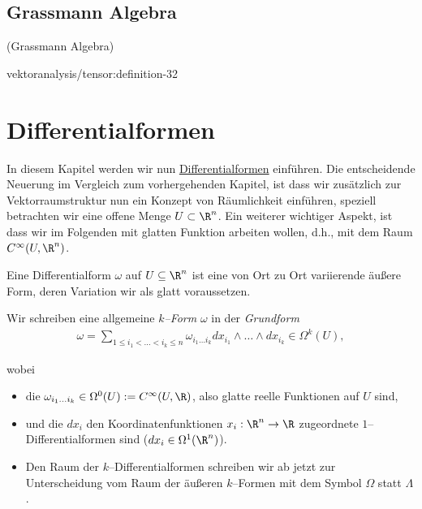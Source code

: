 \documentclass[letterpaper,10pt,english]{jupyterBook}
\begin{document}
\subsection{Grassmann Algebra}
\begin{definition}{(Grassmann Algebra)}{}\label{vektoranalysis/tensor:definition-31}


\end{definition}
\begin{definition}{}{vektoranalysis/tensor:definition-32}


\end{definition}


\section{Differentialformen}
\label{\detokenize{vektoranalysis/diffformen:differentialformen}}\label{\detokenize{vektoranalysis/diffformen::doc}}
\par
In diesem Kapitel werden wir nun \href{https://de.wikipedia.org/wiki/Differentialform}{Differentialformen} einführen. Die entscheidende Neuerung im Vergleich zum vorhergehenden Kapitel, ist
dass wir zusätzlich zur Vektorraumstruktur nun ein Konzept von Räumlichkeit einführen, speziell betrachten wir eine offene Menge \(U\subset\R^n\). Ein weiterer wichtiger Aspekt, ist dass wir im Folgenden mit glatten Funktion arbeiten wollen, d.h., mit dem Raum \(C^\infty(U,\R^n)\).

\par
Eine Differentialform \(\omega\) auf \(U\subseteq\R^n\) ist eine von Ort zu Ort variierende äußere Form, deren Variation wir als glatt voraussetzen.

\par
Wir schreiben eine allgemeine \emph{\(k\)–Form} \(\omega\) in der \emph{Grundform}
\begin{align*}
\omega = \sum_{1\leq i_1<\ldots<i_k\leq n}\omega_{i_1\ldots i_k}
dx_{i_1}\wedge\ldots\wedge dx_{i_k}\in\Omega^k(U),
\end{align*}
\par
wobei
\begin{itemize}
\item {} 
\par
die \(\omega_{i_1\ldots i_k}\in \Omega^0(U):=C^\infty(U,\R)\), also glatte reelle Funktionen auf \(U\) sind,

\item {} 
\par
und die \(dx_i\) den Koordinatenfunktionen \(x_i:\R^n\to\R\) zugeordnete \(1\)–Differentialformen sind (\(dx_i\in\Omega^1(\R^n)\)).

\item {} 
\par
Den Raum der \(k\)–Differentialformen schreiben wir ab jetzt zur Unterscheidung vom Raum der äußeren \(k\)–Formen mit dem Symbol \(\Omega\) statt \(\Lambda\).

\end{itemize}
\end{document}

